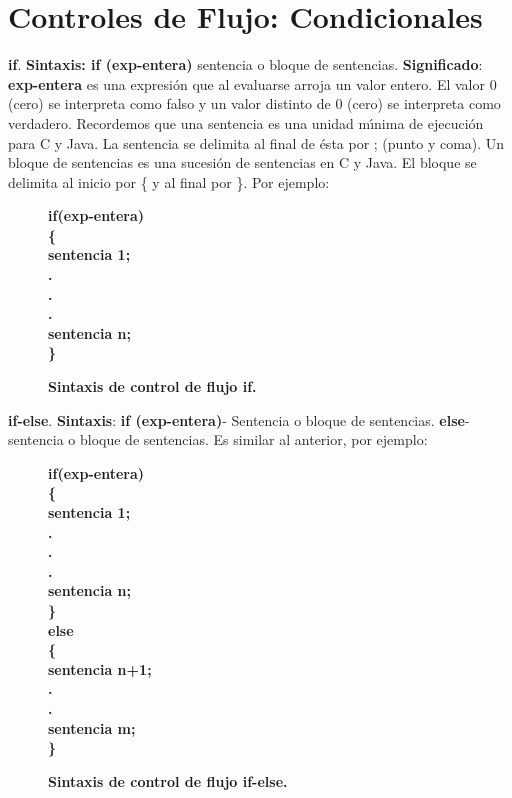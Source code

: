 \documentclass[a4paper]{article}
\begin{document}
\section{Controles de Flujo: Condicionales}
\textbf{if}. \textbf{Sintaxis: if (exp-entera)} sentencia o bloque de sentencias. \textbf{Significado}: \textbf{exp-entera} es una expresión que al evaluarse arroja un valor entero. El valor 0 (cero) se interpreta como falso y un valor distinto de 0 (cero) se interpreta como verdadero. Recordemos que una sentencia es una unidad mı́nima de ejecución para C y Java. La sentencia se delimita al final de ésta por ; (punto y coma). Un bloque de sentencias es una sucesión de sentencias en C y Java. El bloque se delimita al inicio por \{ y al final por \}. Por ejemplo: \\
\begin{figure}[H]
	\centering
\textbf{if(exp-entera)}\\ 
\textbf{\{} \\
\textbf{sentencia 1;}\\
\textbf{.}\\
\textbf{.}\\
\textbf{.}\\
\textbf{sentencia n;}\\
\textbf{\}}\\
	\caption{\textbf{Sintaxis de control de flujo if.}}
\end{figure} 

\pagebreak


\textbf{if-else}. \textbf{Sintaxis}: \textbf{if (exp-entera)}- Sentencia o bloque de sentencias. \textbf{else}- sentencia o bloque de sentencias. Es similar al anterior, por ejemplo: 
\begin{figure}[H]
        \centering
\textbf{if(exp-entera)}\\
\textbf{\{} \\
\textbf{sentencia 1;}\\
\textbf{.}\\
\textbf{.}\\
\textbf{.}\\
\textbf{sentencia n;}\\
\textbf{\}}\\
\textbf{else} \\ 
\textbf{\{} \\
\textbf{sentencia n+1;}\\
\textbf{.}\\
\textbf{.}\\
\textbf{sentencia m;}\\
\textbf{\}}\\
        \caption{\textbf{Sintaxis de control de flujo if-else.}}
\end{figure}
 \\
\end{document}
